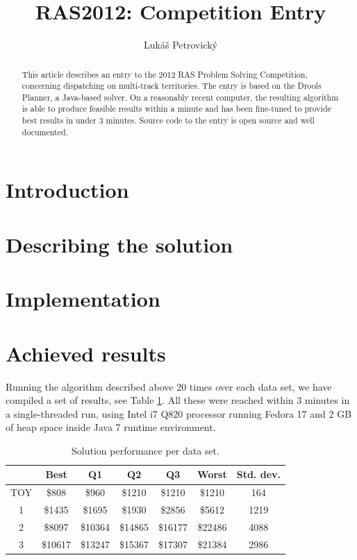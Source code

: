 \documentclass[10pt,a4paper,draft]{article}
\author{Lukáš Petrovický}
\title{RAS2012: Competition Entry}
\begin{document}
\maketitle

\begin{abstract}
This article describes an entry to the 2012 RAS Problem Solving Competition, concerning dispatching on multi-track territories. The entry is based on the Drools Planner, a Java-based solver. On a reasonably recent computer, the resulting algorithm is able to produce feasible results within a minute and has been fine-tuned to provide best results in under 3 minutes. Source code to the entry is open source and well documented.
\end{abstract}

\section{Introduction}

\section{Describing the solution}

\section{Implementation}

\section{Achieved results}

Running the algorithm described above 20 times over each data set, we have compiled a set of results, see Table \ref{table:results}. All these were reached within 3 minutes in a single-threaded run, using Intel i7 Q820 processor running Fedora 17 and 2 GB of heap space inside Java 7 runtime environment.

\begin{table}
\caption{Solution performance per data set.}
\begin{tabular}{c||c|c|c|c|c|c}
\hline \hline
    & Best    & Q1      & Q2      & Q3      & Worst   & Std. dev. \\ 
\hline
TOY & \$808   & \$960   & \$1210  & \$1210  & \$1210  & 164 \\ 
\hline 
1   & \$1435  & \$1695  & \$1930  & \$2856  & \$5612  & 1219 \\ 
\hline 
2   & \$8097  & \$10364 & \$14865 & \$16177 & \$22486 & 4088 \\ 
\hline 
3   & \$10617 & \$13247 & \$15367 & \$17307 & \$21384 & 2986 \\ 
\end{tabular} 
\label{table:results}
\end{table}
\end{document}
